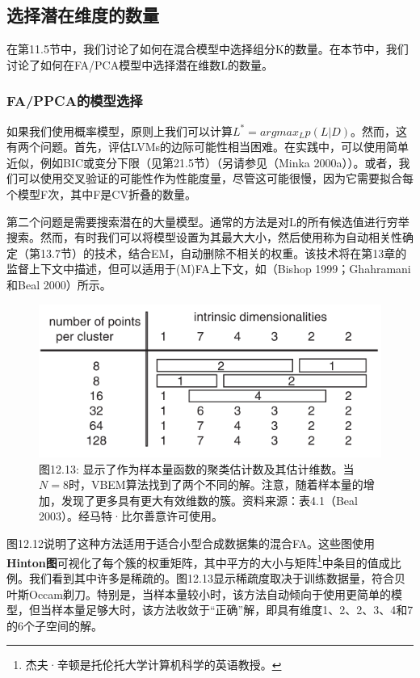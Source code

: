 \documentclass[a4paper]{article}
\begin{document}
\subsection{选择潜在维度的数量 }

在第11.5节中，我们讨论了如何在混合模型中选择组分K的数量。在本节中，我们讨论了如何在FA/PCA模型中选择潜在维数L的数量。
\subsubsection{FA/PPCA的模型选择 }

如果我们使用概率模型，原则上我们可以计算$L^*=argmax_Lp(L|D)$。然而，这有两个问题。首先，评估LVMs的边际可能性相当困难。在实践中，可以使用简单近似，例如BIC或变分下限（见第21.5节）（另请参见（Minka 2000a））。或者，我们可以使用交叉验证的可能性作为性能度量，尽管这可能很慢，因为它需要拟合每个模型F次，其中F是CV折叠的数量。

第二个问题是需要搜索潜在的大量模型。通常的方法是对L的所有候选值进行穷举搜索。然而，有时我们可以将模型设置为其最大大小，然后使用称为自动相关性确定（第13.7节）的技术，结合EM，自动删除不相关的权重。该技术将在第13章的监督上下文中描述，但可以适用于(M)FA上下文，如（Bishop 1999；Ghahramani和Beal 2000）所示。

\begin{figure}[h]
	\centering
	\includegraphics[width=0.7\linewidth]{fig/figure13}
	\caption*{图12.13: 显示了作为样本量函数的聚类估计数及其估计维数。当$N=8$时，VBEM算法找到了两个不同的解。注意，随着样本量的增加，发现了更多具有更大有效维数的簇。资料来源：表4.1（Beal 2003）。经马特·比尔善意许可使用。}
\end{figure}

图12.12说明了这种方法适用于适合小型合成数据集的混合FA。这些图使用\textbf{Hinton图}可视化了每个簇的权重矩阵，其中平方的大小与矩阵\footnote{杰夫·辛顿是托伦托大学计算机科学的英语教授。}中条目的值成比例。我们看到其中许多是稀疏的。图12.13显示稀疏度取决于训练数据量，符合贝叶斯Occam剃刀。特别是，当样本量较小时，该方法自动倾向于使用更简单的模型，但当样本量足够大时，该方法收敛于“正确”解，即具有维度1、2、2、3、4和7的6个子空间的解。
\end{document}
